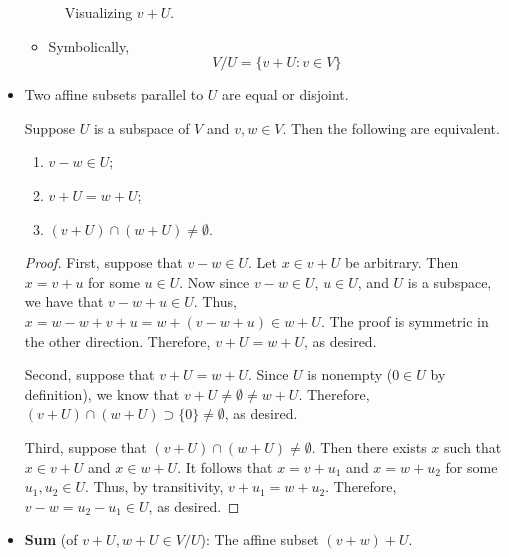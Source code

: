 \documentclass[../main.tex]{subfiles}
\begin{document}
\begin{itemize}
\begin{figure}[H]
        \caption{Visualizing $v+U$.}
        \label{fig:vU}
    \end{figure}
    \begin{itemize}
        \item Symbolically,
        \begin{equation*}
            V/U = \{v+U:v\in V\}
        \end{equation*}
    \end{itemize}
    \item Two affine subsets parallel to $U$ are equal or disjoint.
    \begin{theorem}\label{trm:affineEquivalenceProperties}
        Suppose $U$ is a subspace of $V$ and $v,w\in V$. Then the following are equivalent.
        \begin{enumerate}[label={\textup{(}\alph*\textup{)}}]
            \item $v-w\in U$;
            \item $v+U=w+U$;
            \item $(v+U)\cap(w+U)\neq\emptyset$.
        \end{enumerate}
        \begin{proof}
            First, suppose that $v-w\in U$.  Let $x\in v+U$ be arbitrary. Then $x=v+u$ for some $u\in U$. Now since $v-w\in U$, $u\in U$, and $U$ is a subspace, we have that $v-w+u\in U$. Thus, $x=w-w+v+u=w+(v-w+u)\in w+U$. The proof is symmetric in the other direction. Therefore, $v+U=w+U$, as desired.\par
            Second, suppose that $v+U=w+U$. Since $U$ is nonempty ($0\in U$ by definition), we know that $v+U\neq\emptyset\neq w+U$. Therefore, $(v+U)\cap(w+U)\supset\{0\}\neq\emptyset$, as desired.\par
            Third, suppose that $(v+U)\cap(w+U)\neq\emptyset$. Then there exists $x$ such that $x\in v+U$ and $x\in w+U$. It follows that $x=v+u_1$ and $x=w+u_2$ for some $u_1,u_2\in U$. Thus, by transitivity, $v+u_1=w+u_2$. Therefore, $v-w=u_2-u_1\in U$, as desired.
        \end{proof}
    \end{theorem}
    \item \textbf{Sum} (of $v+U,w+U\in V/U$): The affine subset $(v+w)+U$.

\end{itemize}
\end{document}
